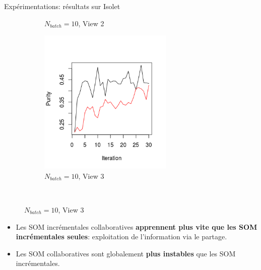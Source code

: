 \documentclass[hyperref={pdfpagelabels=false}]{beamer}
\begin{document}
\begin{frame}{Expérimentations: résultats sur Isolet}
\begin{figure}[!h]
\begin{subfigure}[b]{0.3\textwidth}
                    \caption{$N_{batch}=10$, View 2}
                \end{subfigure}
                \begin{subfigure}[b]{0.3\textwidth}
                    \centering
                    \includegraphics[width=0.7\textwidth, trim= 0cm 0.5cm 1cm 2cm, clip]{img/33.png}
                    \caption{$N_{batch}=10$, View 3}
                \end{subfigure}\\
            \end{figure}
            \begin{itemize}
                \item Les SOM incrémentales collaboratives \textbf{apprennent 
                    plus vite que les SOM incrémentales seules}:                 
                    exploitation de l'information via le partage.
                \item Les SOM collaboratives sont globalement \textbf{plus 
                    instables} que les SOM incrémentales.
            \end{itemize}
        \end{frame}
\end{document}
